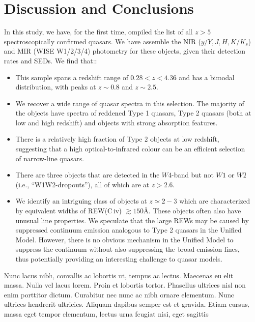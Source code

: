 \documentclass[usenatbib]{mnras}
\begin{document}
\section{Discussion and Conclusions}
\label{sec:conclusions}
In this study, we have, for the first time, ompiled the list of all
$z>5$ spectroscopically confirmed quasars. We have assemble the NIR
($y/Y, J, H, K/K_{s}$) and MIR (WISE W1/2/3/4) photometry for these
objects, given their detection rates and SEDs. We find that::


\begin{itemize}
    \item{This sample spans a redshift range of $0.28 < z < 4.36$ and has a bimodal distribution, with peaks 
        at $z\sim0.8$ and $z\sim2.5$.}
   \item{We recover a wide range of quasar spectra in this selection.  
        The majority of the objects have spectra of reddened Type 1
        quasars, Type 2 quasars (both at low and high redshift) and objects
        with strong absorption features.} 
    \item{There is a relatively high fraction of Type 2 objects at low redshift,
        suggesting that a high optical-to-infrared colour can be an efficient
        selection of narrow-line quasars.}
    \item{There are three objects that are detected in the $W4$-band but
        not $W1$ or $W2$ (i.e., ``W1W2-dropouts''), all of which are at
        $z>2.6$.}
    \item{We identify an intriguing class of objects at $z\simeq 2-3$ which are
        characterized by equivalent widths of REW(C\,{\sc iv})
        $\gtrsim150$\AA.  These objects often also have unusual line
        properties.  We speculate that the large REWs may be caused by
        suppressed continuum emission analogous to Type 2 quasars in the
        Unified Model. However, there is no obvious mechanism in the Unified
        Model to suppress the continuum without also suppressing the broad
        emission lines, thus potentially providing an interesting challenge to
        quasar models.} 
\end{itemize}
Nunc lacus nibh, convallis ac lobortis ut, tempus ac lectus. Maecenas
eu elit massa. Nulla vel lacus lorem. Proin et lobortis
tortor. Phasellus ultrices nisl non enim porttitor dictum. Curabitur
nec nunc ac nibh ornare elementum. Nunc ultrices hendrerit
ultricies. Aliquam dapibus semper est et gravida. Etiam cursus, massa
eget tempor elementum, lectus urna feugiat nisi, eget sagittis
\end{document}
